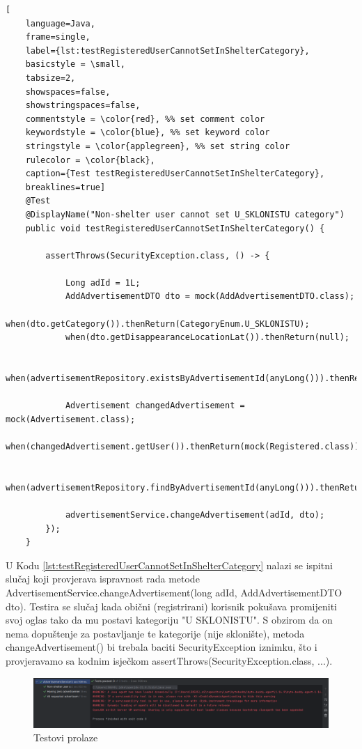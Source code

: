\pagebreak

\begin{lstlisting}[
	language=Java,
	frame=single,
	label={lst:testRegisteredUserCannotSetInShelterCategory},
	basicstyle = \small,
	tabsize=2,
	showspaces=false,
	showstringspaces=false,
	commentstyle = \color{red}, %% set comment color
	keywordstyle = \color{blue}, %% set keyword color
	stringstyle = \color{applegreen}, %% set string color
	rulecolor = \color{black},
	caption={Test testRegisteredUserCannotSetInShelterCategory},
	breaklines=true]
	@Test
	@DisplayName("Non-shelter user cannot set U_SKLONISTU category")
	public void testRegisteredUserCannotSetInShelterCategory() {
		
		assertThrows(SecurityException.class, () -> {
			
			Long adId = 1L;
			AddAdvertisementDTO dto = mock(AddAdvertisementDTO.class);
			when(dto.getCategory()).thenReturn(CategoryEnum.U_SKLONISTU);
			when(dto.getDisappearanceLocationLat()).thenReturn(null);
			
			when(advertisementRepository.existsByAdvertisementId(anyLong())).thenReturn(true);
			
			Advertisement changedAdvertisement = mock(Advertisement.class);
			when(changedAdvertisement.getUser()).thenReturn(mock(Registered.class));
			
			when(advertisementRepository.findByAdvertisementId(anyLong())).thenReturn(Optional.of(changedAdvertisement));
			
			advertisementService.changeAdvertisement(adId, dto);
		});
	}
\end{lstlisting}

U Kodu \ref{lst:testRegisteredUserCannotSetInShelterCategory} nalazi se ispitni slučaj koji provjerava ispravnost rada metode AdvertisementService.changeAdvertisement(long adId, AddAdvertisementDTO dto). Testira se slučaj kada obični (registrirani) korisnik pokušava promijeniti svoj oglas tako da mu postavi kategoriju "U SKLONISTU". S obzirom da on nema dopuštenje za postavljanje te kategorije (nije sklonište), metoda changeAdvertisement() bi trebala baciti SecurityException iznimku, što i provjeravamo sa kodnim isječkom assertThrows(SecurityException.class, ...).

\pagebreak

\begin{figure}[!htb]
	\centering
	\includegraphics[width=\textwidth]{slike/test1.png}
	\caption{Testovi prolaze}
\end{figure}

